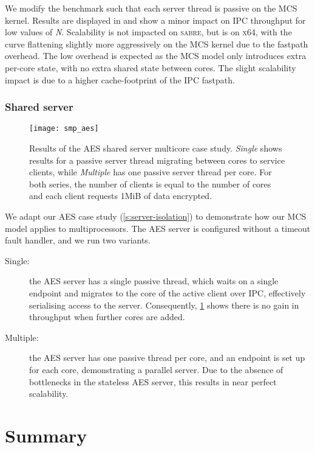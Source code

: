 We modify the benchmark such that each server thread is passive on the MCS kernel.
Results are displayed in  and show a minor impact on IPC throughput
for low values of \textit{N}. Scalability is not impacted on \textsc{sabre}, but is on \textsc{x64},
with the curve flattening slightly more aggressively on the MCS kernel
due to the fastpath overhead. The low overhead is expected as the MCS model only introduces extra 
per-core state, with no extra shared state between cores. The slight scalability impact is
due to a higher cache-footprint of the IPC fastpath. 
\subsubsection{Shared server}

\begin{figure}[b] 
    \centering
    \texttt{[image: smp\_aes]}
    \caption[Results of the AES shared server multicore case study.]{Results of the AES shared server multicore case study. \emph{Single} shows results for a 
        passive server thread migrating between cores to service clients, while \emph{Multiple} has one
        passive server thread per core. For both series, the number of clients is equal to the number of
        cores and each client requests 1MiB of data encrypted. }
    \label{f:evaluation-smp-aes}
\end{figure}

We adapt our \gls{AES} case study (\cref{s:server-isolation}) to demonstrate how our MCS model 
applies to multiprocessors. The AES server is configured without a timeout fault handler, and
we run two variants. 

\begin{description}
    \item[Single:] the AES server has a single passive thread, which waits on a single endpoint
        and migrates to the core of the active client over IPC, effectively serialising access to the server.
        Consequently, \cref{f:evaluation-smp-aes} shows there is no gain in throughput when further cores are
        added. 
    \item[Multiple:] the AES server has one passive thread per core, and an endpoint is set up for
        each core, demonstrating a parallel server. Due to the absence of bottlenecks in the stateless 
        AES server, this results in near perfect scalability.
\end{description}

\section{Summary}

